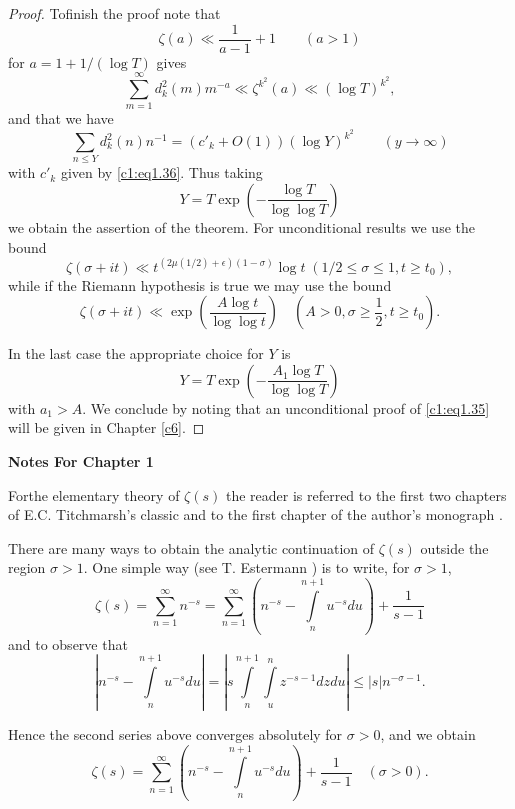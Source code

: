 \begin{proof}
To\pageoriginale finish the proof note that
$$
\zeta (a) \ll \frac{1}{a-1} +1 \qquad (a> 1)
$$
for $a=1+ 1/(\log T)$ gives
$$
\sum^\infty_{m=1}d_k^2 (m) m^{-a} \ll \zeta^{k^2} (a) \ll (\log T)^{k^2},
$$
and that we have
\begin{equation}
  \sum_{n \leq Y} d_k^2 (n) n^{-1} = (c'_k + O(1)) (\log Y)^{k^2}
  \qquad (y \to \infty) \label{c1:eq1.39}
\end{equation}
with $c'_k$ given by \eqref{c1:eq1.36}. Thus taking
$$
Y = T \exp \left(- \frac{\log T}{\log \log T} \right)
$$
we obtain the assertion of the theorem. For unconditional results we
use the bound
$$
\zeta (\sigma + it) \ll t^{(2 \mu (1/2)+ \epsilon)(1- \sigma)} \log t
\; (1/2 \leq \sigma \leq 1, t \geq t_0),
$$
while if the Riemann hypothesis is true we may use the bound 
\begin{equation}
  \zeta (\sigma + it) \ll \exp \left( \frac{A \log t}{\log \log
    t}\right) \quad \left(A > 0, \sigma \geq \frac{1}{2}, t \geq
  t_0\right).\label{c1:eq1.40}
\end{equation}

In the last case the appropriate choice for $Y$ is 
$$
Y= T \exp \left(- \frac{A_1 \log T}{\log \log T} \right)
$$
with $a_1 > A$. We conclude by noting that an unconditional proof of
\eqref{c1:eq1.35} will be given in Chapter \ref{c6}.
\end{proof}

\newpage

\begin{center}
  \textbf{\LARGE Notes For Chapter 1}
\end{center}

\medskip
For\pageoriginale the elementary theory of $\zeta(s)$ the reader is
referred to the first two chapters of E.C. Titchmarsh's classic
\cite{Titchmarsh1} and to the first chapter of the author's monograph \cite{Titchmarsh1}.

There are many ways to obtain the analytic continuation of $\zeta(s)$
outside the region $\sigma > 1$. One simple way (see T. Estermann
\cite{Estermann4}) is to write, for $\sigma> 1$,
$$
\zeta(s) = \sum_{n=1}^\infty n^{-s} = \sum^\infty_{n=1} \left(n^{-s} -
\int\limits_{n}^{n+1} u^{-s}du\right) + \frac{1}{s-1}
$$
and to observe that
$$
\left|n^{-s} - \int\limits_n^{n+1} u^{-s} du \right| = \left| s
\int\limits_n^{n+1} \int\limits_u^n z^{-s-1} dz du \right| \leq
|s|n^{- \sigma-1}.
$$

Hence the second series above converges absolutely for $\sigma > 0$,
and we obtain
$$
\zeta(s) = \sum^\infty_{n=1} \left(n^{-s}- \int\limits_n^{n+1} u^{-s}
du \right) + \frac{1}{s-1} \quad (\sigma > 0).
$$

